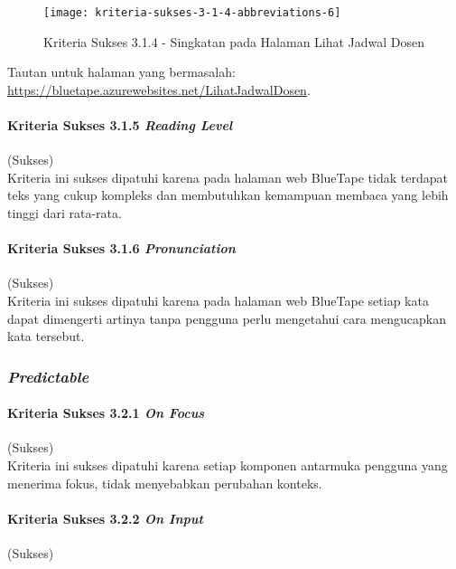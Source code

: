 \begin{itemize}
    \begin{figure}[H]
        \centering  
        \texttt{[image: kriteria-sukses-3-1-4-abbreviations-6]}  
        \caption[Kriteria Sukses 3.1.4 - Singkatan pada Halaman Lihat Jadwal Dosen]{Kriteria Sukses 3.1.4 - Singkatan pada Halaman Lihat Jadwal Dosen}
        \label{fig:3.1.4_abbreviations_6}  
    \end{figure}
    Tautan untuk halaman yang bermasalah: \url{https://bluetape.azurewebsites.net/LihatJadwalDosen}.
\end{itemize}

\paragraph{Kriteria Sukses 3.1.5 \textit{Reading Level}}
\label{par:kepatuhan_bluetape_kriteria_sukses_3.1.5}
(Sukses)\\

Kriteria ini sukses dipatuhi karena pada halaman web BlueTape tidak terdapat teks yang cukup kompleks dan membutuhkan kemampuan membaca yang lebih tinggi dari rata-rata.

\paragraph{Kriteria Sukses 3.1.6 \textit{Pronunciation}}
\label{par:kepatuhan_bluetape_kriteria_sukses_3.1.6}
(Sukses)\\

Kriteria ini sukses dipatuhi karena pada halaman web BlueTape setiap kata dapat dimengerti artinya tanpa pengguna perlu mengetahui cara mengucapkan kata tersebut.

\subsubsection{\textit{Predictable}}
\label{subsubsec:kepatuhan_bluetape_predictable}

\paragraph{Kriteria Sukses 3.2.1 \textit{On Focus}}
\label{par:kepatuhan_bluetape_kriteria_sukses_3.2.1}
(Sukses)\\

Kriteria ini sukses dipatuhi karena setiap komponen antarmuka pengguna yang menerima fokus, tidak menyebabkan perubahan konteks.

\paragraph{Kriteria Sukses 3.2.2 \textit{On Input}}
\label{par:kepatuhan_bluetape_kriteria_sukses_3.2.2}
(Sukses)\\

